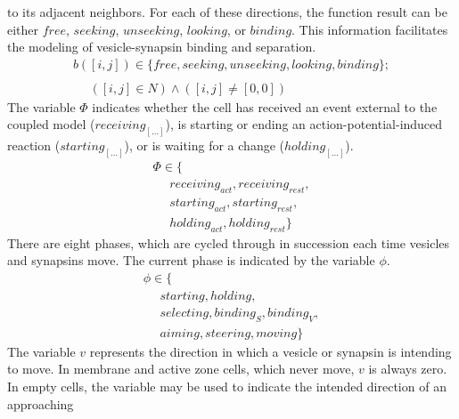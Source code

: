 \documentclass{acm_proc_article-sp}
\begin{document}
to its adjacent neighbors.  For each of these directions, the function
result can be either $free$, $seeking$, $unseeking$, $looking$, or 
$binding$.  This information facilitates the modeling of 
vesicle-synapsin binding and separation.
\begin{displaymath} \begin{array}{l}
b([i,j]) \in \{free, seeking, unseeking, looking, binding\}; \\
\\
\hspace{16pt} ([i, j] \in N) \wedge ([i, j] \ne [0, 0])
\end{array} \end{displaymath}
The variable $\Phi$ indicates whether the cell has 
received an event external to the coupled model 
($receiving_{[...]}$), is starting or ending an 
action-potential-induced reaction 
($starting_{[...]}$), or is 
waiting for a change ($holding_{[...]}$).
\begin{displaymath} \begin{array}{l} 
\Phi \in \{ \\
\hspace{16pt} receiving_{act}, receiving_{rest}, \\
\hspace{16pt} starting_{act}, starting_{rest}, \\
\hspace{16pt} holding_{act}, holding_{rest} \}
\end{array} \end{displaymath}
There are eight phases, which are cycled through in 
succession each time vesicles and synapsins move.  The current 
phase is indicated by the variable $\phi$.
\begin{displaymath} \begin{array}{l}
\phi \in \{ \\
\hspace{16pt} starting, holding, \\
\hspace{16pt} selecting, binding_S, binding_V, \\
\hspace{16pt} aiming, steering, moving \}
\end{array} \end{displaymath}
The variable $v$ represents the direction in which a vesicle or 
synapsin is intending to move.  In membrane and active zone cells,
which never move, $v$ is always zero.  In empty cells, the variable 
may be used to indicate the intended direction of an approaching 
\end{document}
